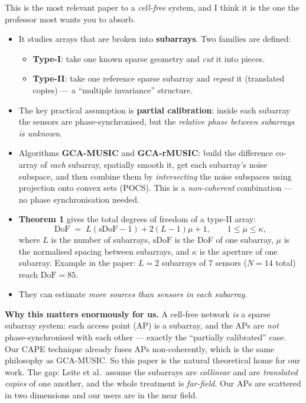 \documentclass[11pt]{article}
\begin{document}
This is the most relevant paper to a \emph{cell-free} system, and I think it is the one the professor
most wants you to absorb.
\begin{itemize}
\item It studies arrays that are broken into \textbf{subarrays}. Two families are defined:
  \begin{itemize}
  \item \textbf{Type-I}: take one known sparse geometry and \emph{cut} it into pieces.
  \item \textbf{Type-II}: take one reference sparse subarray and \emph{repeat} it (translated copies)
  --- a ``multiple invariance'' structure.
  \end{itemize}
\item The key practical assumption is \textbf{partial calibration}: inside each subarray the sensors
are phase-synchronised, but the \emph{relative phase between subarrays is unknown}.
\item Algorithms \textbf{GCA-MUSIC} and \textbf{GCA-rMUSIC}: build the difference co-array of
\emph{each} subarray, spatially smooth it, get each subarray's noise subspace, and then combine them
by \emph{intersecting} the noise subspaces using projection onto convex sets (POCS). This is a
\emph{non-coherent} combination --- no phase synchronisation needed.
\item \textbf{Theorem 1} gives the total degrees of freedom of a type-II array:
\[
\mathrm{DoF}\;=\;L(\mathrm{sDoF}-1)+2(L-1)\mu+1 ,\qquad 1\le\mu\le\kappa,
\]
where $L$ is the number of subarrays, $\mathrm{sDoF}$ is the DoF of one subarray, $\mu$ is the
normalised spacing between subarrays, and $\kappa$ is the aperture of one subarray. Example in the
paper: $L=2$ subarrays of $7$ sensors ($N=14$ total) reach $\mathrm{DoF}=85$.
\item They can estimate \emph{more sources than sensors in each subarray}.
\end{itemize}

\begin{keybox}
\textbf{Why this matters enormously for us.} A cell-free network \emph{is} a sparse subarray system:
each access point (AP) is a subarray, and the APs are \emph{not} phase-synchronised with each other
--- exactly the ``partially calibrated'' case. Our CAPE technique already fuses APs non-coherently,
which is the same philosophy as GCA-MUSIC. So this paper is the natural theoretical home for our
work. The gap: Leite et al.\ assume the subarrays are \emph{collinear} and are \emph{translated
copies} of one another, and the whole treatment is \emph{far-field}. Our APs are scattered in two
dimensions and our users are in the near field.
\end{keybox}
\end{document}
